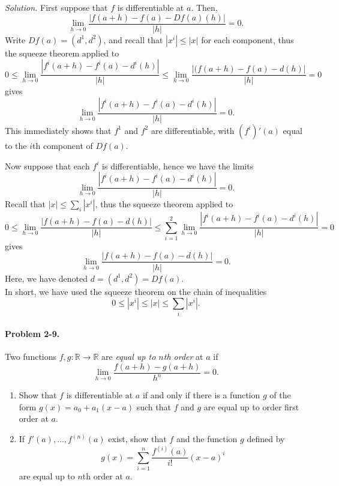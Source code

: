 \documentclass[11pt]{report}
\newcommand{\R}{\mathbb{R}}
\newcommand{\problem}[1]{\paragraph{Problem #1.}}
\newcommand{\solution}{\noindent\textit{Solution.} }
\begin{document}
    \solution First suppose that $f$ is differentiable at $a$. Then, \[
        \lim_{h \to 0} \frac{|f(a + h) - f(a) - Df(a)(h)|}{|h|} = 0.
    \] Write $Df(a) = (d^1, d^2)$, and recall that $|x^i| \leq |x|$ for each
    component, thus the squeeze theorem applied to \[
        0 \leq \lim_{h \to 0} \frac{|f^i(a + h) - f^i(a) - d^i(h)|}{|h|} \leq 
        \lim_{h \to 0} \frac{|(f(a + h) - f(a) - d(h)|}{|h|} = 0
    \] gives \[
        \lim_{h \to 0} \frac{|f^i(a + h) - f^i(a) - d^i(h)|}{|h|} = 0.
    \] This immediately shows that $f^1$ and $f^2$ are differentiable, with
    $(f^i)'(a)$ equal to the $i$th component of $Df(a)$.

    Now suppose that each $f^i$ is differentiable, hence we have the limits \[
        \lim_{h \to 0} \frac{|f^i(a + h) - f^i(a) - d^i(h)|}{|h|} = 0.
    \] Recall that $|x| \leq \sum_{i} |x^i|$, thus the squeeze theorem applied to \[
        0 \leq \lim_{h \to 0} \frac{|f(a + h) - f(a) - d(h)|}{|h|} \leq \sum_{i =
        1}^2 \lim_{h \to 0} \frac{|f^i(a + h) - f^i(a) - d^i(h)|}{|h|} = 0
    \] gives \[
        \lim_{h \to 0} \frac{|f(a + h) - f(a) - d(h)|}{|h|} = 0.
    \] Here, we have denoted $d = (d^1, d^2) = Df(a)$. \\

    In short, we have used the squeeze theorem on the chain of inequalities \[
        0 \leq |x^i| \leq |x| \leq \sum_{i} |x^i|.
    \]


    \problem{2-9} Two functions $f, g\colon \R \to \R$ are \emph{equal up to $n$th
    order} at $a$ if \[
        \lim_{h \to 0} \frac{f(a + h) - g(a + h)}{h^n} = 0.
    \] 
    \begin{enumerate}
        \item Show that $f$ is differentiable at $a$ if and only if there is a
        function $g$ of the form $g(x) = a_0 + a_1(x - a)$ such that $f$ and $g$ are
        equal up to order first order at $a$.

        \item If $f'(a), \dots, f^{(n)}(a)$ exist, show that $f$ and the function $g$
        defined by \[
            g(x) = \sum_{i = 1}^n \frac{f^{(i)}(a)}{i!}(x - a)^i
        \] are equal up to $n$th order at $a$.
    \end{enumerate}
\end{document}
